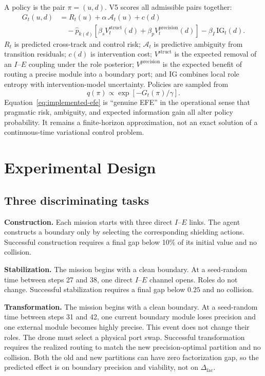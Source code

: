 \documentclass[11pt,a4paper]{article}
\numberwithin{equation}{section}
\newcommand{\Gap}{\Delta_{\mathrm{fac}}}
\begin{document}
A policy is the pair $\pi=(u,d)$. V5 scores all admissible pairs together:
\begin{align}
 G_t(u,d)
 &=R_t(u)+\alpha\,\mathcal A_t(u)
 +c(d) \\
 &\quad-\widehat p_{k(d)}
 \left[\beta_s V^{\mathrm{struct}}_t(d)
 +\beta_p V^{\mathrm{precision}}_t(d)\right]
 -\beta_I\,\mathrm{IG}_t(d).
 \label{eq:implemented-efe}
\end{align}
$R_t$ is predicted cross-track and control risk; $\mathcal A_t$ is predictive
ambiguity from transition residuals; $c(d)$ is intervention cost;
$V^{\mathrm{struct}}$ is the expected removal of an $I$--$E$ coupling under
the role posterior; $V^{\mathrm{precision}}$ is the expected benefit of
routing a precise module into a boundary port; and $\mathrm{IG}$ combines
local role entropy with intervention-model uncertainty. Policies are sampled
from
\begin{equation}
 q(\pi)\propto\exp[-G_t(\pi)/\gamma].
 \label{eq:policy-softmax}
\end{equation}
Equation~\eqref{eq:implemented-efe} is ``genuine EFE'' in the operational
sense that pragmatic risk, ambiguity, and expected information gain all alter
policy probability. It remains a finite-horizon approximation, not an exact
solution of a continuous-time variational control problem.

\section{Experimental Design}

\subsection{Three discriminating tasks}

\textbf{Construction.} Each mission starts with three direct $I$--$E$ links.
The agent constructs a boundary only by selecting the corresponding shielding
actions. Successful construction requires a final gap below 10\% of its
initial value and no collision.

\textbf{Stabilization.} The mission begins with a clean boundary. At a
seed-random time between steps 27 and 38, one direct $I$--$E$ channel opens.
Roles do not change. Successful stabilization requires a final gap below
$0.25$ and no collision.

\textbf{Transformation.} The mission begins with a clean boundary. At a
seed-random time between steps 31 and 42, one current boundary module loses
precision and one external module becomes highly precise. This event does not
change their roles. The drone must select a physical port swap. Successful
transformation requires the realized routing to match the new
precision-optimal partition and no collision. Both the old and new partitions
can have zero factorization gap, so the predicted effect is on boundary
precision and viability, not on $\Gap$.
\end{document}
